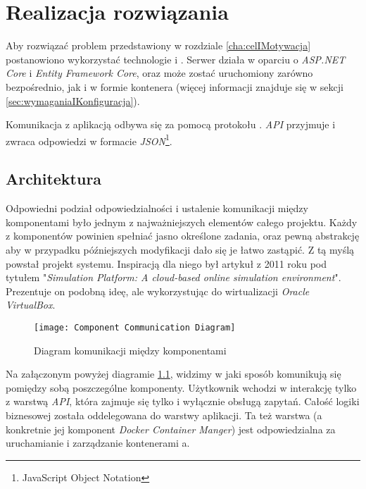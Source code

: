 \chapter{Realizacja rozwiązania}
\label{cha:realizacjaRozwiazania}

\par Aby rozwiązać problem przedstawiony w rozdziale \ref{cha:celIMotywacja} postanowiono wykorzystać technologie \dotnet{} i \docker{}. Serwer działa w oparciu o \emph{ASP.NET Core} i \emph{Entity Framework Core}, oraz może zostać uruchomiony zarówno bezpośrednio, jak i w formie kontenera (więcej informacji znajduje się w sekcji \ref{sec:wymaganiaIKonfiguracja}).

\par Komunikacja z aplikacją odbywa się za pomocą protokołu \texttt{\https{}}. \emph{API} przyjmuje i zwraca odpowiedzi w formacie \emph{JSON}\footnote{JavaScript Object Notation}.

\section{Architektura}

\par Odpowiedni podział odpowiedzialności i ustalenie komunikacji między komponentami było jednym z najważniejszych elementów całego projektu. Każdy z komponentów powinien spełniać jasno określone zadania, oraz pewną abstrakcję aby w przypadku późniejszych modyfikacji dało się je łatwo zastąpić. Z tą myślą powstał projekt systemu. Inspiracją dla niego był artykuł z 2011 roku pod tytułem "\emph{Simulation Platform: A cloud-based online simulation environment}"\cite{YAMAZAKI2011693}. Prezentuje on podobną ideę, ale wykorzystując do wirtualizacji \emph{Oracle VirtualBox}.

\begin{figure}[H]
	\texttt{[image: Component Communication Diagram]}
	\caption{Diagram komunikacji między komponentami}
	\label{fig:componentCommunicationDiagram}
\end{figure}

\par Na załączonym powyżej diagramie \ref{fig:componentCommunicationDiagram}, widzimy w jaki sposób komunikują się pomiędzy sobą poszczególne komponenty. Użytkownik wchodzi w interakcję tylko z warstwą \emph{API}, która zajmuje się tylko i wyłącznie obsługą zapytań. Całość logiki biznesowej została oddelegowana do warstwy aplikacji. Ta też warstwa (a konkretnie jej komponent \emph{Docker Container Manger}) jest odpowiedzialna za uruchamianie i zarządzanie kontenerami \emph{\docker{}}a.


